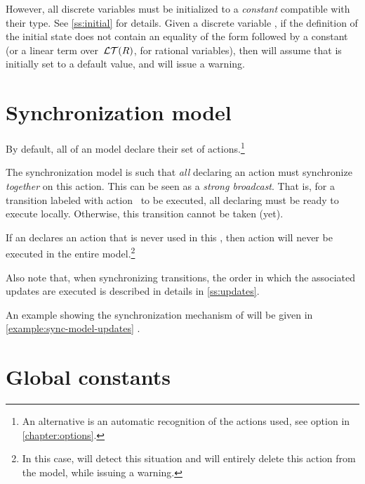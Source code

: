 However, all discrete variables must be initialized to a \emph{constant} compatible with their type.
See \cref{ss:initial} for details.
Given a discrete variable , if the definition of the initial state does not contain an equality of the form  followed by a constant (or a linear term over~$\mathcal{LT}(R)$, for rational variables), then \imitator{} will assume that  is initially set to a default value, and will issue a warning.



\section{Synchronization model}\label{sect:synchronization}

By default, all \IPTA{} of an \imitator{} model declare their set of actions.\footnote{%
	An alternative is an automatic recognition of the actions used, see option  in \cref{chapter:options}.
}

The \imitator{} synchronization model is such that \emph{all} \IPTA{} declaring an action must synchronize \emph{together} on this action.
This can be seen as a \emph{strong broadcast}.
That is, for a transition labeled with action~ to be executed, all \IPTA{} declaring  must be ready to execute  locally.
Otherwise, this transition cannot be taken (yet).

If an \IPTA{} declares an action  that is never used in this \IPTA{}, then action  will never be executed in the entire model.\footnote{%
	In this case, \imitator{} will detect this situation and will entirely delete this action from the model, while issuing a warning.
}

Also note that, when synchronizing transitions, the order in which the associated updates are executed is described in details in \cref{ss:updates}.

An example showing the synchronization mechanism of \imitator{} will be given in \cref{example:sync-model-updates} \pageref{example:sync-model-updates}.


\section{Global constants}

